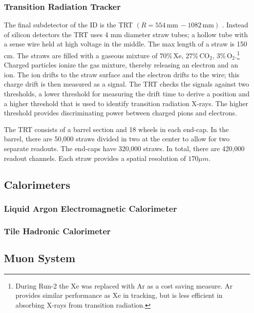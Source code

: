 		\subsubsection{Transition Radiation Tracker}\label{sssec:TRT}
		The final subdetector of the ID is the TRT $(R=554 \, \mathrm{mm} \, - 1082 \, \mathrm{mm})$ . Instead of silicon detectors the TRT uses 4 mm diameter straw tubes; a hollow tube with a sense wire held at high voltage in the middle. The max length of a straw is 150 cm. The straws are filled with a gaseous mixture of $70\% \, \mathrm{Xe,} \, 27\% \, \mathrm{CO}_2, \, 3\% \, \mathrm{O}_2$.\footnote{During Run-2 the Xe was replaced with Ar as a cost saving measure. Ar provides similar performance as Xe in tracking, but is less efficient in absorbing X-rays from transition radiation.} Charged particles ionize the gas mixture, thereby releasing an electron and an ion. The ion drifts to the straw surface and the electron drifts to the wire; this charge drift is then measured as a signal. The TRT checks the signals against two thresholds, a lower threshold for measuring the drift time to derive a position and a higher threshold that is used to identify transition radiation X-rays. The higher threshold provides discriminating power between charged pions and electrons.

		The TRT consists of a barrel section and 18 wheels in each end-cap. In the barrel, there are 50,000 straws divided in two at the center to allow for two separate readouts. The end-caps have 320,000 straws. In total, there are 420,000 readout channels. Each straw provides a spatial resolution of $170 \mu m$. \cite{ATLAS-ID}

	\subsection{Calorimeters}\label{ssec:calorimeters}

		\subsubsection{Liquid Argon Electromagnetic Calorimeter}\label{sssec:LAr}

		\subsubsection{Tile Hadronic Calorimeter}\label{sssec:Tile}

	\subsection{Muon System}\label{ssec:muon-system}

